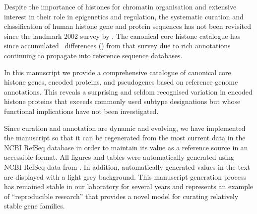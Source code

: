     Despite the importance of histones for chromatin organisation and extensive interest
    in their role in epigenetics and regulation, the systematic
    curation and classification of human histone
    gene and protein sequences has not been revisited
    since the landmark 2002 survey by \citet{Marzluff02}.
    The canonical core histone catalogue has since accumulated
    \TotalChangesSinceReference{}~differences
    ()
    from that survey due to rich annotations continuing to propagate
    into reference sequence databases.

    In this manuscript we provide a comprehensive catalogue
    of canonical core histone genes, encoded proteins, and pseudogenes
    based on reference genome annotations.
    This reveals a surprising and seldom recognised variation in encoded histone proteins
    that exceeds commonly used subtype designations
    but whose functional implications have not been investigated.

    Since curation and annotation are dynamic and evolving, we have
    implemented the manuscript so that it can be regenerated from the
    most current data in the NCBI RefSeq database in order to maintain
    its value as a reference source in an accessible format.  All
    figures and tables were automatically generated using NCBI RefSeq
    data from \printdate{\SequencesDate{}}.  In addition,
    automatically generated values in the text are displayed with a
    light grey background.  This manuscript generation process has
    remained stable in our laboratory for several years and represents
    an example of ``reproducible research'' \citep{Claerbout2000} that
    provides a novel model for curating relatively stable gene
    families.
